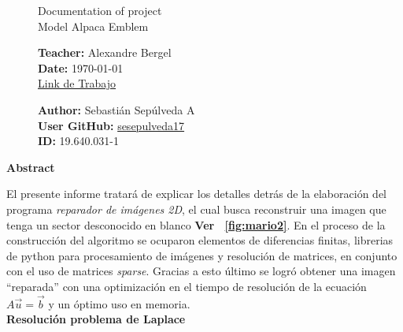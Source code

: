 \documentclass[letterpaper,10.7pt]{article}
\newcommand{\figref}[1]{\figurename~\ref{#1}}
\begin{document}
\pagestyle{style1}
\begin{figure}
\centering
\begin{minipage}[c]{0.8\textwidth}
\centering
\vspace{0.3cm}
{\large Documentation of project}
\vspace{0.1cm}\\
{\Large Model Alpaca Emblem}
\vspace{0.3cm}\\
  \begin{minipage}{0.48\textwidth}
    \centering
   	\textbf{Teacher:} Alexandre Bergel\\
	\textbf{Date:} \today\\
	\href{https://github.com/sesepulveda17/homeWork-cc3002/tree/master/t1}{Link de Trabajo}
   \end{minipage}\hfill
   \begin{minipage}{0.48\textwidth}
    \centering
   	\textbf{Author:} Sebastián Sepúlveda A\\
	\textbf{User GitHub:} \href{https://github.com/sesepulveda17}{sesepulveda17}\\
	\textbf{ID:} 19.640.031-1
   \end{minipage}
\end{minipage}
\end{figure}

\begin{center}
\textbf{{\large Abstract}}
\end{center}

El presente informe tratará de explicar los detalles detrás de la elaboración del programa \textit{reparador de imágenes 2D}, el cual busca reconstruir una imagen que tenga un sector desconocido en blanco \textbf{Ver \figref{fig:mario2}}. En el proceso de la construcción del algoritmo se ocuparon elementos de diferencias finitas, librerias de python para procesamiento de imágenes y resolución de matrices, en conjunto con el uso de matrices \textit{sparse}. Gracias a esto último se logró obtener una imagen ``reparada'' con una optimización en el tiempo de resolución de la ecuación $A \vec{u} = \vec{b}$ y un óptimo uso en memoria. \\


{\centering \textbf{{\Large Resolución problema de Laplace}}}\\
\end{document}
